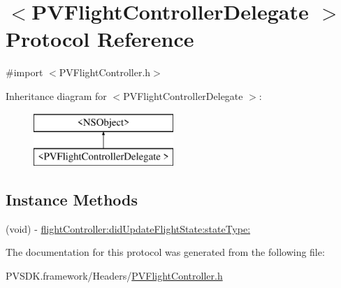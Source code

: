 \hypertarget{protocol_p_v_flight_controller_delegate_01-p}{}\section{$<$P\+V\+Flight\+Controller\+Delegate $>$ Protocol Reference}
\label{protocol_p_v_flight_controller_delegate_01-p}


{\ttfamily \#import $<$P\+V\+Flight\+Controller.\+h$>$}

Inheritance diagram for $<$P\+V\+Flight\+Controller\+Delegate $>$\+:\begin{figure}[H]
\begin{center}
\leavevmode
\includegraphics[height=2.000000cm]{protocol_p_v_flight_controller_delegate_01-p}
\end{center}
\end{figure}
\subsection*{Instance Methods}
\begin{DoxyCompactItemize}
\item 
(void) -\/ \hyperlink{group___p_v_s_d_k___c_o_r_e___a_p_i___f_l_i_g_h_t_c_o_n_t_r_o_l_ga7065f4031ff8e4f9215d2a30f6efed8e}{flight\+Controller\+:did\+Update\+Flight\+State\+:state\+Type\+:}
\end{DoxyCompactItemize}


The documentation for this protocol was generated from the following file\+:\begin{DoxyCompactItemize}
\item 
P\+V\+S\+D\+K.\+framework/\+Headers/\hyperlink{_p_v_flight_controller_8h}{P\+V\+Flight\+Controller.\+h}\end{DoxyCompactItemize}
